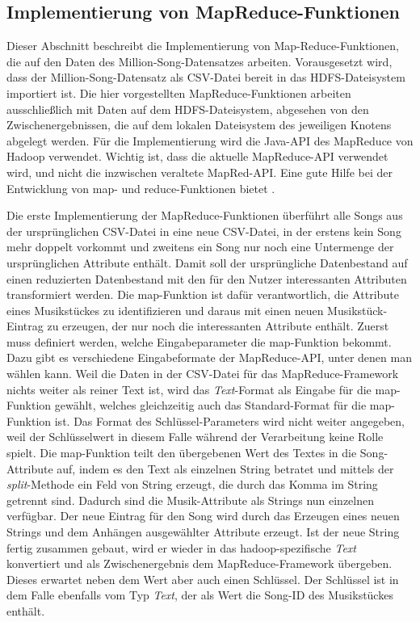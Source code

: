 \subsection{Implementierung von MapReduce-Funktionen}

Dieser Abschnitt beschreibt die Implementierung von Map-Reduce-Funktionen, die auf den Daten
des Million-Song-Datensatzes arbeiten. Vorausgesetzt wird, dass der Million-Song-Datensatz als
CSV-Datei bereit in das HDFS-Dateisystem importiert ist. Die hier vorgestellten MapReduce-Funktionen
arbeiten ausschließlich mit Daten auf dem HDFS-Dateisystem, abgesehen von den Zwischenergebnissen,
die auf dem lokalen Dateisystem des jeweiligen Knotens abgelegt werden.
Für die Implementierung wird die Java-API des MapReduce von Hadoop verwendet. Wichtig ist,
dass die aktuelle MapReduce-API verwendet wird, und nicht die inzwischen veraltete MapRed-API.
Eine gute Hilfe bei der Entwicklung von map- und reduce-Funktionen bietet \cite{miner2012mapreduce}.

Die erste Implementierung der MapReduce-Funktionen überführt alle Songs aus der ursprünglichen
CSV-Datei in eine neue CSV-Datei, in der erstens kein Song mehr doppelt vorkommt und zweitens
ein Song nur noch eine Untermenge der ursprünglichen Attribute enthält. Damit soll der ursprüngliche
Datenbestand auf einen reduzierten Datenbestand mit den für den Nutzer interessanten Attributen 
transformiert werden. Die map-Funktion ist dafür verantwortlich, die Attribute eines Musikstückes
zu identifizieren und daraus mit einen neuen Musikstück-Eintrag zu erzeugen, der nur noch die interessanten
Attribute enthält.
Zuerst muss definiert werden, welche Eingabeparameter die map-Funktion bekommt. Dazu gibt es verschiedene
Eingabeformate der MapReduce-API, unter denen man wählen kann. Weil die Daten in der CSV-Datei für das
MapReduce-Framework nichts weiter als reiner Text ist, wird das \textit{Text}-Format als Eingabe für
die map-Funktion gewählt, welches gleichzeitig auch das Standard-Format für die map-Funktion ist.
Das Format des Schlüssel-Parameters wird nicht weiter angegeben, weil der Schlüsselwert in diesem Falle 
während der Verarbeitung keine Rolle spielt.
Die map-Funktion teilt den übergebenen Wert des Textes in die Song-Attribute auf, indem es den Text
als einzelnen String betratet und mittels der \textit{split}-Methode ein Feld von String erzeugt, die durch
das Komma im String getrennt sind. Dadurch sind die Musik-Attribute als Strings nun einzelnen verfügbar.
Der neue Eintrag für den Song wird durch das Erzeugen eines neuen Strings und dem Anhängen ausgewählter
Attribute erzeugt. Ist der neue String fertig zusammen gebaut, wird er wieder in das hadoop-spezifische \textit{Text}
konvertiert und als Zwischenergebnis dem MapReduce-Framework übergeben. Dieses erwartet neben dem 
Wert aber auch einen Schlüssel. Der Schlüssel ist in dem Falle ebenfalls vom Typ \textit{Text}, der als Wert die
Song-ID des Musikstückes enthält.

